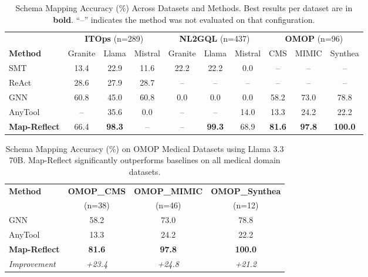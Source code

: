 
\begin{table}[htbp]
\centering
\caption{Schema Mapping Accuracy (\%) Across Datasets and Methods. Best results per dataset are in \textbf{bold}. ``--'' indicates the method was not evaluated on that configuration.}
\label{tab:main_results}
\begin{tabular}{l|ccc|ccc|ccc}
\toprule
& \multicolumn{3}{c|}{\textbf{ITOps} (n=289)} & \multicolumn{3}{c|}{\textbf{NL2GQL} (n=437)} & \multicolumn{3}{c}{\textbf{OMOP} (n=96)} \\
\textbf{Method} & Granite & Llama & Mistral & Granite & Llama & Mistral & CMS & MIMIC & Synthea \\
\midrule
SMT & 13.4 & 22.9 & 11.6 & 22.2 & 22.2 & 0.0 & -- & -- & -- \\
ReAct & 28.6 & 27.9 & 28.7 & -- & -- & -- & -- & -- & -- \\
GNN & 60.8 & 45.0 & 60.8 & 0.0 & 0.0 & 0.0 & 58.2 & 73.0 & 78.8 \\
AnyTool & -- & 35.6 & 0.0 & -- & -- & 14.0 & 13.3 & 24.2 & 22.2 \\
\midrule
\textbf{Map-Reflect} & 66.4 & \textbf{98.3} & -- & -- & \textbf{99.3} & 68.9 & \textbf{81.6} & \textbf{97.8} & \textbf{100.0} \\
\bottomrule
\end{tabular}
\end{table}

\begin{table}[htbp]
\centering
\caption{Schema Mapping Accuracy (\%) on OMOP Medical Datasets using Llama 3.3 70B. Map-Reflect significantly outperforms baselines on all medical domain datasets.}
\label{tab:omop_results}
\begin{tabular}{lccc}
\toprule
\textbf{Method} & \textbf{OMOP\_CMS} & \textbf{OMOP\_MIMIC} & \textbf{OMOP\_Synthea} \\
& (n=38) & (n=46) & (n=12) \\
\midrule
GNN & 58.2 & 73.0 & 78.8 \\
AnyTool & 13.3 & 24.2 & 22.2 \\
\midrule
\textbf{Map-Reflect} & \textbf{81.6} & \textbf{97.8} & \textbf{100.0} \\
\midrule
\textit{Improvement} & \textit{+23.4} & \textit{+24.8} & \textit{+21.2} \\
\bottomrule
\end{tabular}
\end{table}

